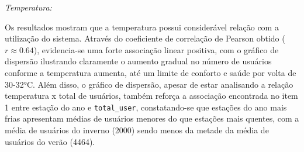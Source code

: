 \textit{Temperatura:}

Os resultados mostram que a temperatura possui considerável relação com a utilização do sistema. Através do coeficiente de correlação de Pearson obtido ($r \approx 0.64$), evidencia-se uma forte associação linear positiva, com o gráfico de dispersão ilustrando claramente o aumento gradual no número de usuários conforme a temperatura aumenta, até um limite de conforto e saúde por volta de 30-32°C. Além disso, o gráfico de dispersão, apesar de estar analisando a relação temperatura x total de usuários, também reforça a associação encontrada no item 1 entre estação do ano e \texttt{total\_user}, constatando-se que estações do ano mais frias apresentam médias de usuários menores do que estações mais quentes, com a média de usuários do inverno (2000) sendo menos da metade da média de usuários do verão (4464).
